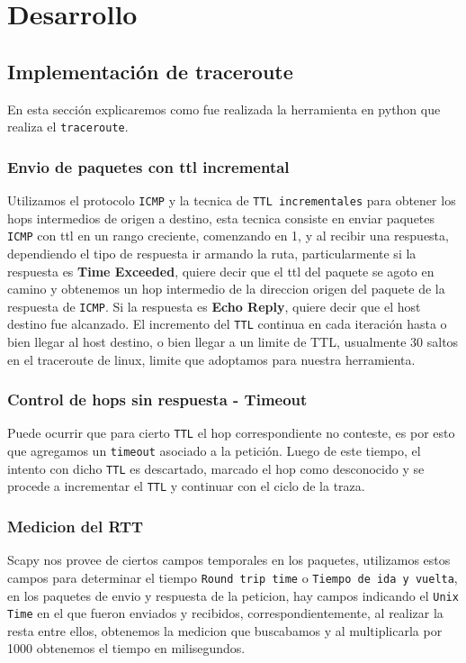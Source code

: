 \section{Desarrollo}
\subsection{Implementación de traceroute}
En esta sección explicaremos como fue realizada la herramienta en python que realiza el \texttt{traceroute}.
\subsubsection{Envio de paquetes con ttl incremental}
Utilizamos el protocolo \texttt{ICMP} y la tecnica de \texttt{TTL incrementales} para obtener los hops intermedios de origen a destino, esta tecnica consiste en enviar paquetes \texttt{ICMP} con ttl en un rango creciente, comenzando en 1, y al recibir una respuesta, dependiendo el tipo de respuesta ir armando la ruta, particularmente si la respuesta es \textbf{Time Exceeded}, quiere decir que el ttl del paquete se agoto en camino y obtenemos un hop intermedio de la direccion origen del paquete de la respuesta de \texttt{ICMP}. Si la respuesta es \textbf{Echo Reply}, quiere decir que el host destino fue alcanzado. El incremento del \texttt{TTL} continua en cada iteración hasta o bien llegar al host destino, o bien llegar a un limite de TTL, usualmente 30 saltos en el traceroute de linux, limite que adoptamos para nuestra herramienta.
\subsubsection{Control de hops sin respuesta - Timeout}
Puede ocurrir que para cierto \texttt{TTL} el hop correspondiente no conteste, es por esto que agregamos un \texttt{timeout} asociado a la petici\'on. Luego de este tiempo, el intento con dicho \texttt{TTL} es descartado, marcado el hop como desconocido y se procede a incrementar el \texttt{TTL} y continuar con el ciclo de la traza.
\subsubsection{Medicion del RTT}
Scapy nos provee de ciertos campos temporales en los paquetes, utilizamos estos campos para determinar el tiempo \texttt{Round trip time} o \texttt{Tiempo de ida y vuelta}, en los paquetes de envio y respuesta de la peticion, hay campos indicando el \texttt{Unix Time} en el que fueron enviados y recibidos, correspondientemente, al realizar la resta entre ellos, obtenemos la medicion que buscabamos y al multiplicarla por 1000 obtenemos el tiempo en milisegundos.


